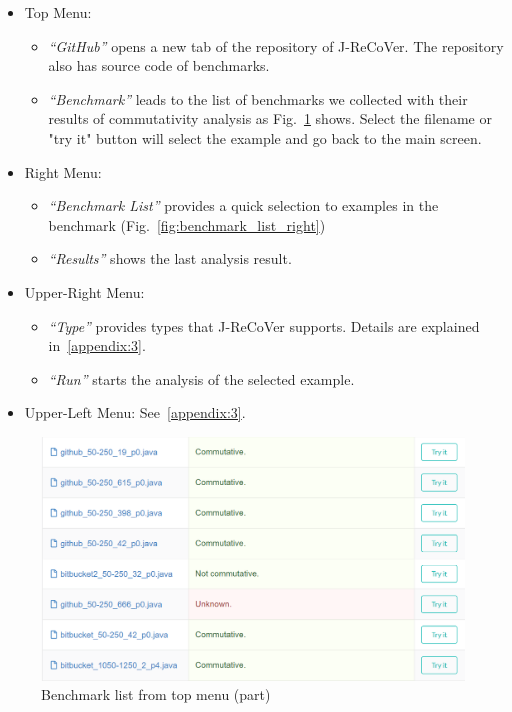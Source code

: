 \begin{itemize}
\item
Top Menu:
\begin{itemize}
\item
\emph{``GitHub''} opens a new tab of the repository of J-ReCoVer. The repository also has source code of benchmarks.
\item
\emph{``Benchmark''} leads to the list of benchmarks we collected with their results of commutativity analysis as Fig.~\ref{fig:benchmark_list} shows. Select the filename or "try it" button will select the example and go back to the main screen.
\end{itemize}
\item
Right Menu:
\begin{itemize}
\item
\emph{``Benchmark List''} provides a quick selection to examples in the benchmark (Fig.~\ref{fig:benchmark_list_right})
\item
\emph{``Results''} shows the last analysis result.
\end{itemize}
\item
Upper-Right Menu:
\begin{itemize}
\item
\emph{``Type''} provides types that J-ReCoVer supports. Details are explained in~\ref{appendix:3}.
\item
\emph{``Run''} starts the analysis of the selected example.
\end{itemize}
\item
Upper-Left Menu: See~\ref{appendix:3}.
\end{itemize}

\begin{figure}
\begin{center}
\includegraphics[width=.8\linewidth]{screenshots/benchmark_list}
\caption{Benchmark list from top menu (part)}
\label{fig:benchmark_list}
\end{center}
\end{figure}

